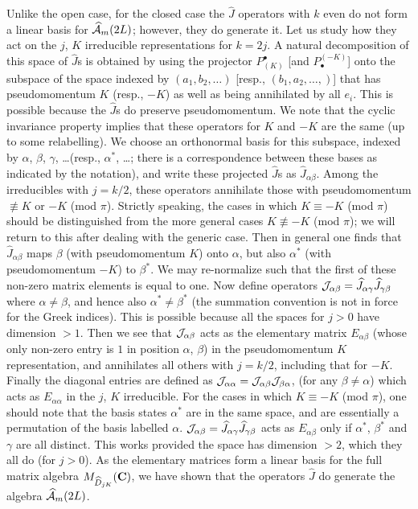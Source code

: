 \documentclass[twocolumn,floats,pra]{revtex4}
\def \hcA {\widehat{\cal A}}
\begin{document}
Unlike the open case, for the closed case the $\widehat{J}$
operators with $k$ even do not form a linear basis for
$\hcA_m(2L)$; however, they do generate it. Let us study how they
act on the $j$, $K$ irreducible representations for $k=2j$. A
natural decomposition of this space of $\widehat{J}$s is obtained
by using the projector $P^\bullet_{(K)}$ [and $P_\bullet^{(-K)}$]
onto the subspace of the space indexed by $(a_1,b_2,\ldots)$
[resp., $(b_1,a_2,\ldots,)$] that has pseudomomentum $K$ (resp.,
$-K$) as well as being annihilated by all $e_i$. This is possible
because the $\widehat{J}$s do preserve pseudomomentum. We note
that the cyclic invariance property implies that these operators
for $K$ and $-K$ are the same (up to some relabelling). We choose
an orthonormal basis for this subspace, indexed by $\alpha$,
$\beta$, $\gamma$, \ldots (resp., $\alpha^*$, \ldots; there is a
correspondence between these bases as indicated by the notation),
and write these projected $\widehat{J}$s as
$\widehat{J}_{\alpha\beta}$. Among the irreducibles with $j=k/2$,
these operators annihilate those with pseudomomentum $\not\equiv
K$ or $-K$ (mod $\pi$). Strictly speaking, the cases in which
$K\equiv -K$ (mod $\pi$) should be distinguished from the more
general cases $K\not \equiv -K$ (mod $\pi$); we will return to
this after dealing with the generic case. Then in general one
finds that $\widehat{J}_{\alpha\beta}$ maps $\beta$ (with
pseudomomentum $K$) onto $\alpha$, but also $\alpha^*$ (with
pseudomomentum $-K$) to $\beta^*$. We may re-normalize such that
the first of these non-zero matrix elements is equal to one. Now
define operators ${\cal J}_{\alpha\beta}=
\widehat{J}_{\alpha\gamma}\widehat{J}_{\gamma\beta}$ where
$\alpha\neq\beta$, and hence also $\alpha^*\neq\beta^*$ (the
summation convention is not in force for the Greek indices). This
is possible because all the spaces for $j>0$ have dimension $>1$.
Then we see that ${\cal J}_{\alpha\beta}$ acts as the elementary
matrix $E_{\alpha\beta}$ (whose only non-zero entry is $1$ in
position $\alpha$, $\beta$) in the pseudomomentum $K$
representation, and annihilates all others with $j=k/2$, including
that for $-K$. Finally the diagonal entries are defined as ${\cal
J}_{\alpha\alpha}={\cal J}_{\alpha\beta}{\cal J}_{\beta\alpha}$,
(for any $\beta\neq\alpha$) which acts as $E_{\alpha\alpha}$ in
the $j$, $K$ irreducible. For the cases in which $K\equiv -K$ (mod
$\pi$), one should note that the basis states $\alpha^*$ are in
the same space, and are essentially a permutation of the basis
labelled $\alpha$. ${\cal J}_{\alpha\beta}=
\widehat{J}_{\alpha\gamma}\widehat{J}_{\gamma\beta}$ acts as
$E_{\alpha\beta}$ only if $\alpha^*$, $\beta^*$ and $\gamma$ are
all distinct. This works provided the space has dimension $>2$,
which they all do (for $j>0$). As the elementary matrices form a
linear basis for the full matrix algebra
$M_{\widehat{D}_{jK}}({\bf C})$, we have shown that the operators
$\widehat{J}$ do generate the algebra $\hcA_m(2L)$.
\end{document}
